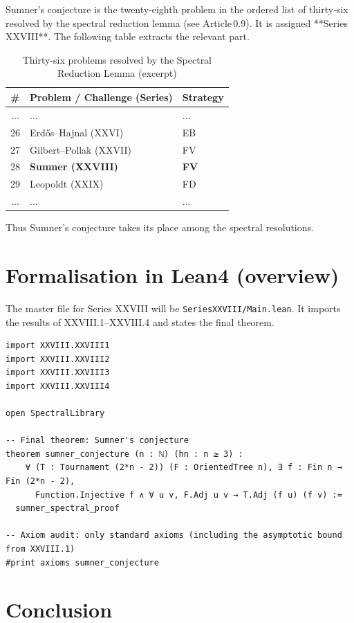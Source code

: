 \documentclass[11pt,a4paper]{article}
\begin{document}
Sumner's conjecture is the twenty‑eighth problem in the ordered list of thirty‑six resolved by the spectral reduction lemma (see Article 0.9). It is assigned **Series XXVIII**. The following table extracts the relevant part.

\begin{center}
\begin{longtable}{@{}cll@{}}
\caption{Thirty‑six problems resolved by the Spectral Reduction Lemma (excerpt)}\\
\toprule
\# & Problem / Challenge (Series) & Strategy \\
\midrule
... & ... & ... \\
26 & Erdős–Hajnal (XXVI) & EB \\
27 & Gilbert–Pollak (XXVII) & FV \\
28 & \textbf{Sumner (XXVIII)} & \textbf{FV} \\
29 & Leopoldt (XXIX) & FD \\
... & ... & ... \\
\bottomrule
\end{longtable}
\end{center}

Thus Sumner's conjecture takes its place among the spectral resolutions.

\section{Formalisation in Lean4 (overview)}

The master file for Series XXVIII will be \texttt{SeriesXXVIII/Main.lean}. It imports the results of XXVIII.1–XXVIII.4 and states the final theorem.

\begin{lstlisting}[style=lean, caption={MainXXVIII.lean (sketch)}]
import XXVIII.XXVIII1
import XXVIII.XXVIII2
import XXVIII.XXVIII3
import XXVIII.XXVIII4

open SpectralLibrary

-- Final theorem: Sumner's conjecture
theorem sumner_conjecture (n : ℕ) (hn : n ≥ 3) :
    ∀ (T : Tournament (2*n - 2)) (F : OrientedTree n), ∃ f : Fin n → Fin (2*n - 2),
      Function.Injective f ∧ ∀ u v, F.Adj u v → T.Adj (f u) (f v) :=
  sumner_spectral_proof

-- Axiom audit: only standard axioms (including the asymptotic bound from XXVIII.1)
#print axioms sumner_conjecture
\end{lstlisting}

\section{Conclusion}
\end{document}
